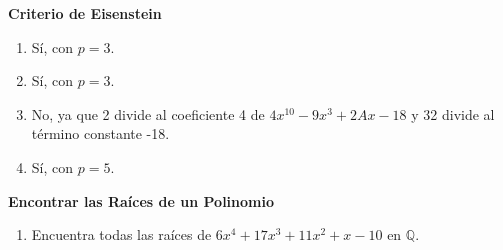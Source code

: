 \textbf{Criterio de Eisenstein}
	
\begin{enumerate}
	\item Sí, con \(p = 3\).
		
	\item Sí, con \(p = 3\).
		
	\item No, ya que 2 divide al coeficiente 4 de \(4x^{10} - 9x^3 + 2Ax - 18\) y 32 divide al término constante -18.
		
	\item Sí, con \(p = 5\).
\end{enumerate}
	
\textbf{Encontrar las Raíces de un Polinomio}
	
\begin{enumerate}
	\item Encuentra todas las raíces de \(6x^4 + 17x^3 + 11x^2 + x - 10\) en \(\mathbb{Q}\).
\end{enumerate}

